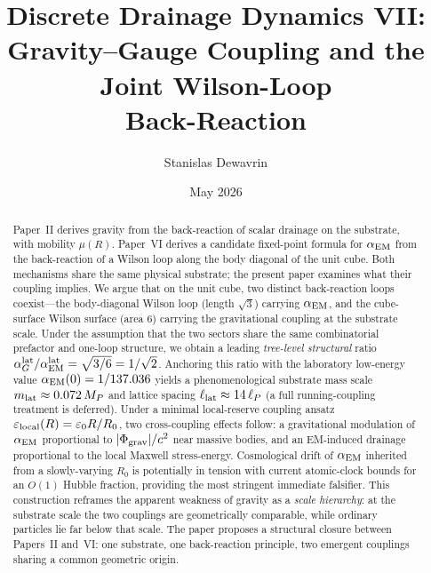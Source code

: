 \documentclass[11pt,a4paper]{article}
\title{\textbf{Discrete Drainage Dynamics VII:\\
Gravity--Gauge Coupling and the Joint Wilson-Loop\\
Back-Reaction}}
\author[1]{Stanislas Dewavrin}
\affil[1]{Independent researcher \\ \texttt{dewavrin.iphone@gmail.com}}
\date{May 2026}
\begin{document}
\maketitle

\begin{abstract}
\noindent
Paper~II derives gravity from the back-reaction of scalar
drainage on the substrate, with mobility $\mu(R)$. Paper~VI
derives a candidate fixed-point formula for $\alpha_{\rm EM}$
from the back-reaction of a Wilson loop along the body diagonal
of the unit cube. Both mechanisms share the same physical
substrate; the present paper examines what their coupling
implies. We argue that on the unit cube, two distinct
back-reaction loops coexist---the body-diagonal Wilson loop
(length $\sqrt{3}$) carrying $\alpha_{\rm EM}$, and the
cube-surface Wilson surface (area $6$) carrying the
gravitational coupling at the substrate scale. Under the
assumption that the two sectors share the same combinatorial
prefactor and one-loop structure, we obtain a leading
\emph{tree-level structural} ratio
$\alpha_G^{\rm lat}/\alpha_{\rm EM}^{\rm lat}
= \sqrt{3/6} = 1/\sqrt{2}$. Anchoring this ratio with the
laboratory low-energy value $\alpha_{\rm EM}(0) = 1/137.036$
yields a phenomenological substrate mass scale $m_{\rm lat}
\approx 0.072\,M_P$ and lattice spacing $\ell_{\rm lat}
\approx 14\,\ell_P$ (a full running-coupling treatment is
deferred). Under a minimal local-reserve coupling ansatz
$\varepsilon_{\rm local}(R) = \varepsilon_0 R/R_0$, two
cross-coupling effects follow: a gravitational modulation of
$\alpha_{\rm EM}$ proportional to $|\Phi_{\rm grav}|/c^2$ near
massive bodies, and an EM-induced drainage proportional to the
local Maxwell stress-energy. Cosmological drift of $\alpha_{\rm
EM}$ inherited from a slowly-varying $R_0$ is potentially in
tension with current atomic-clock bounds for an $O(1)$ Hubble
fraction, providing the most stringent immediate falsifier. This
construction reframes the apparent weakness of gravity as a
\emph{scale hierarchy}: at the substrate scale the two
couplings are geometrically comparable, while ordinary particles
lie far below that scale. The paper proposes a structural
closure between Papers~II and~VI: one substrate, one
back-reaction principle, two emergent couplings sharing a
common geometric origin.
\end{abstract}
\end{document}
